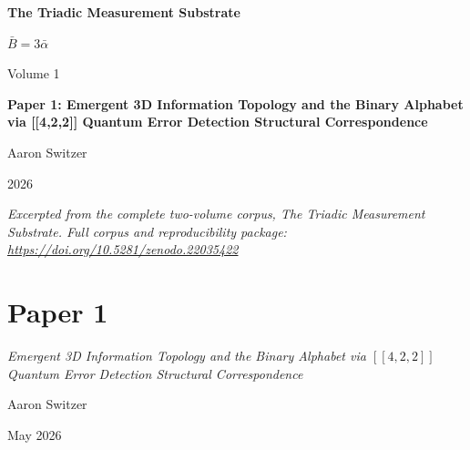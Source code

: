 \documentclass[11pt,oneside]{report}
\theoremstyle{definition}
\theoremstyle{remark}
\begin{document}
\thispagestyle{empty}
\begin{titlepage}
\centering
\vspace*{2cm}
{\sffamily\bfseries\Large The Triadic Measurement Substrate\par}
\vspace{0.6cm}
{\large $\bar{B} = 3\bar{\alpha}$\par}
\vspace{1cm}
{\sffamily\large Volume 1\par}
\vspace{1.4cm}
{\Large \bfseries Paper 1: Emergent 3D Information Topology and the Binary Alphabet via [[4,2,2]] Quantum Error Detection Structural Correspondence\par}
\vfill
{\large Aaron Switzer\par}
\vspace{0.4cm}
{\large 2026\par}
\vspace{1.2cm}
{\small\itshape Excerpted from the complete two-volume corpus, \emph{The Triadic Measurement Substrate}. Full corpus and reproducibility package: \url{https://doi.org/10.5281/zenodo.22035422}\par}
\end{titlepage}
\cleardoublepage
{}

\chapter*{Paper 1}
\begingroup\centering
{\large\itshape Emergent 3D Information Topology and the Binary Alphabet via $[[4,2,2]]$ Quantum Error Detection Structural Correspondence\par}\vspace{0.8em}
{\normalsize Aaron Switzer\par}
{\small May 2026\par}
\endgroup\vspace{1.0em}

\par\vspace{0.6em}
\end{document}
